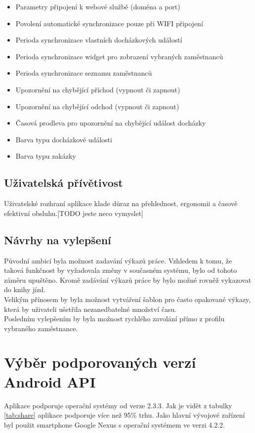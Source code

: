 \documentclass{diplomka}
\begin{document}
\begin{itemize}[noitemsep,nolistsep]
\item Parametry připojení k webové službě (doména a port)
\item Povolení automatické synchronizace pouze při WIFI připojení
\item Perioda synchronizace vlastních docházkových událostí
\item Perioda synchronizace widget pro zobrazení vybraných zaměstnanců
\item Perioda synchronizace seznamu zaměstnanců
\item Upozornění na chybějící příchod (vypnout či zapnout)
\item Upozornění na chybějící odchod (vypnout či zapnout)
\item Časová prodleva pro upozornění na chybějící událost docházky
\item Barva typu docházkové události
\item Barva typu zakázky
\end{itemize}

\subsection{Uživatelská přívětivost}
Uživatelské rozhraní aplikace klade důraz na přehlednost, ergonomii a časově efektivní obsluhu.[TODO jeste neco vymyslet]
\subsection{Návrhy na vylepšení}
Původní ambicí byla možnost zadavání výkazů práce. Vzhledem k tomu, že taková funkčnost by vyžadovala změny v současném systému, bylo od tohoto záměru upuštěno. Kromě zadávání výkazů práce by bylo možné rovněž vykazovat do knihy jízd.\\ \indent
Velikým přínosem by byla možnost vytváření šablon pro často opakované výkazy, která by uživateli ušetřila nezanedbatelné množství času.\\ \indent
Posledním vylepšením by byla možnost rychlého zavolání přímo z profilu vybraného zaměstnance.

\section{Výběr podporovaných verzí Android API}
Aplikace podporuje operační systémy od verze 2.3.3. Jak je vidět z tabulky \ref{tab:share} aplikace podporuje více než 95\% trhu. Jako hlavní vývojové zařízení byl použit smartphone Google Nexus s operační systémem ve verzi 4.2.2.
\end{document}
